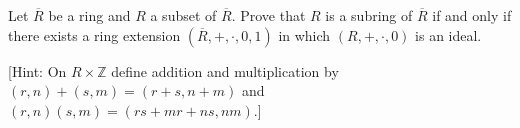 Let $\overline{R}$ be a ring and $R$ a subset of $\overline{R}$. Prove that $R$ is a subring of $\overline{R}$ if and only if there exists a ring extension $(\overline{R}, +, \cdot, 0, 1)$ in which $(R, +, \cdot, 0)$ is an ideal.

[Hint: On $R \times \mathbb{Z}$ define addition and multiplication by $(r,n) + (s,m) = (r + s, n + m)$ and $(r,n)(s,m) = (rs + mr + ns, nm)$.]
